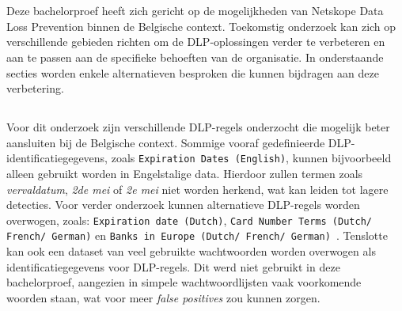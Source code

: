 
\chapter{}%
\label{ch:discussie}

\section{}
\label{sec:toekomstig-onderzoek}

Deze bachelorproef heeft zich gericht op de mogelijkheden van Netskope Data Loss Prevention binnen de Belgische context.
Toekomstig onderzoek kan zich op verschillende gebieden richten om de DLP-oplossingen verder te verbeteren en aan te passen aan de specifieke behoeften van de organisatie.
In onderstaande secties worden enkele alternatieven besproken die kunnen bijdragen aan deze verbetering.

\section{}
\label{sec:alternatieven-dlp-regels}

Voor dit onderzoek zijn verschillende DLP-regels onderzocht die mogelijk beter aansluiten bij de Belgische context.
Sommige vooraf gedefinieerde DLP\--identifica\-tie\-gegevens, zoals \texttt{Expiration Dates (English)}, kunnen bijvoorbeeld alleen gebruikt worden in Engelstalige data.
Hierdoor zullen termen zoals \textit{vervaldatum}, \textit{2de mei} of \textit{2e mei} niet worden herkend, wat kan leiden tot lagere detecties.
Voor verder onderzoek kunnen alternatieve DLP-regels worden overwogen, zoals: \texttt{Expiration date (Dutch)}, \texttt{Card Number Terms (Dutch/ French/ German)} en \texttt{Banks in Europe (Dutch/ French/ German)}~\autocite{B2BPay2016}.  
Tenslotte kan ook een dataset van veel gebruikte wachtwoorden worden overwogen als identificatiegegevens voor DLP-regels. 
Dit werd niet gebruikt in deze bachelorproef, aangezien in simpele wachtwoordlijsten vaak voorkomende woorden staan, wat voor meer \textit{false positives} zou kunnen zorgen.

\section{}
\label{sec:alternatieven-datasets}

